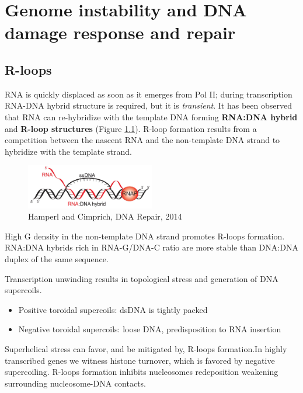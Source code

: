 \graphicspath{{chapters/_resources/}}

\chapter{Genome instability and DNA damage response and repair}


\hypertarget{r-loops}{%
\section{R-loops}\label{r-loops}}

RNA is quickly displaced as soon as it emerges from Pol II; during transcription RNA-DNA hybrid structure is required, but it is \emph{transient}. It has been observed that RNA can re-hybridize with the template DNA forming \textbf{RNA:DNA hybrid} and \textbf{R-loop structures} (Figure \ref{fig:hybrid}). R-loop formation results from a competition between the nascent RNA and the non-template DNA strand to hybridize with the template strand.

\begin{figure}
\centering
\includegraphics[width=0.5\textwidth]{../_resources/Screen_Shot_2022-11-23_at_09-53-33.png}
\caption{Hamperl and Cimprich, DNA Repair, 2014}
\label{fig:hybrid}
\end{figure}

High G density in the non-template DNA strand promotes R-loops formation. RNA:DNA hybrids rich in RNA-G/DNA-C ratio are more stable than DNA:DNA duplex of the same sequence.

Transcription unwinding results in topological stress and generation of DNA supercoils.
\begin{itemize}
\tightlist
\item
  Positive toroidal supercoils: dsDNA is tightly packed
\item
  Negative toroidal supercoils: loose DNA, predisposition to RNA insertion
\end{itemize}

Superhelical stress can favor, and be mitigated by, R-loops formation.In highly transcribed genes we witness histone turnover, which is favored by negative supercoiling. R-loops formation inhibits nucleosomes redeposition weakening surrounding nucleosome-DNA contacts.

